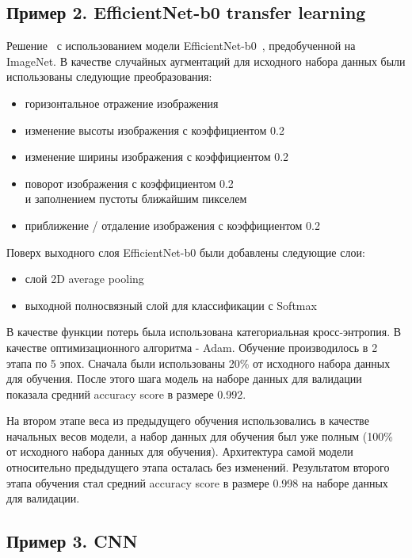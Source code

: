 \documentclass[a4paper,12pt]{extarticle}
\begin{document}
\newpage
\subsection{Пример 2. EfficientNet-b0 transfer learning}

Решение~\cite{example_2} с использованием модели EfficientNet-b0~\cite{efficientnet}, предобученной на ImageNet. В качестве случайных
аугментаций для исходного набора данных были использованы следующие преобразования:

\begin{itemize}
    \item горизонтальное отражение изображения
    \item изменение высоты изображения с коэффициентом 0.2
    \item изменение ширины изображения с коэффициентом 0.2
    \item поворот изображения с коэффициентом 0.2\\ и заполнением пустоты ближайшим пикселем
    \item приближение / отдаление изображения с коэффициентом 0.2
\end{itemize}

Поверх выходного слоя EfficientNet-b0 были добавлены следующие слои:

\begin{itemize}
    \item слой 2D average pooling
    \item выходной полносвязный слой для классификации с Softmax
\end{itemize}

В качестве функции потерь была использована категориальная кросс-энтропия. В качестве
оптимизационного алгоритма - Adam. Обучение производилось в 2 этапа по 5 эпох. Сначала были
использованы 20\% от исходного набора данных для обучения. После этого шага модель на наборе данных
для валидации показала средний accuracy score в размере 0.992.\par

На втором этапе веса из предыдущего обучения использовались в качестве начальных весов модели, а
набор данных для обучения был уже полным (100\% от исходного набора данных для обучения).
Архитектура самой модели относительно предыдущего этапа осталась без изменений. Результатом второго
этапа обучения стал средний accuracy score в размере 0.998 на наборе данных для валидации.

\newpage
\subsection{Пример 3. CNN}
\end{document}
